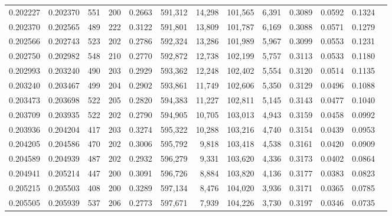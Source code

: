 \begin{tabular}{rrrrrrrrrrrrr}
0.202227 & 0.202370 &   551 & 200 &                                     0.2663 & 591,312 &  14,298 & 101,565 &   6,391 & 0.3089 & 0.0592 & 0.1324 \\
0.202370 & 0.202565 &   489 & 222 &                                     0.3122 & 591,801 &  13,809 & 101,787 &   6,169 & 0.3088 & 0.0571 & 0.1279 \\
0.202566 & 0.202743 &   523 & 202 &                                     0.2786 & 592,324 &  13,286 & 101,989 &   5,967 & 0.3099 & 0.0553 & 0.1231 \\
0.202750 & 0.202982 &   548 & 210 &                                     0.2770 & 592,872 &  12,738 & 102,199 &   5,757 & 0.3113 & 0.0533 & 0.1180 \\
0.202993 & 0.203240 &   490 & 203 &                                     0.2929 & 593,362 &  12,248 & 102,402 &   5,554 & 0.3120 & 0.0514 & 0.1135 \\
0.203240 & 0.203467 &   499 & 204 &                                     0.2902 & 593,861 &  11,749 & 102,606 &   5,350 & 0.3129 & 0.0496 & 0.1088 \\
0.203473 & 0.203698 &   522 & 205 &                                     0.2820 & 594,383 &  11,227 & 102,811 &   5,145 & 0.3143 & 0.0477 & 0.1040 \\
0.203709 & 0.203935 &   522 & 202 &                                     0.2790 & 594,905 &  10,705 & 103,013 &   4,943 & 0.3159 & 0.0458 & 0.0992 \\
0.203936 & 0.204204 &   417 & 203 &                                     0.3274 & 595,322 &  10,288 & 103,216 &   4,740 & 0.3154 & 0.0439 & 0.0953 \\
0.204205 & 0.204586 &   470 & 202 &                                     0.3006 & 595,792 &   9,818 & 103,418 &   4,538 & 0.3161 & 0.0420 & 0.0909 \\
0.204589 & 0.204939 &   487 & 202 &                                     0.2932 & 596,279 &   9,331 & 103,620 &   4,336 & 0.3173 & 0.0402 & 0.0864 \\
0.204941 & 0.205214 &   447 & 200 &                                     0.3091 & 596,726 &   8,884 & 103,820 &   4,136 & 0.3177 & 0.0383 & 0.0823 \\
0.205215 & 0.205503 &   408 & 200 &                                     0.3289 & 597,134 &   8,476 & 104,020 &   3,936 & 0.3171 & 0.0365 & 0.0785 \\
0.205505 & 0.205939 &   537 & 206 &                                     0.2773 & 597,671 &   7,939 & 104,226 &   3,730 & 0.3197 & 0.0346 & 0.0735 \\

\end{tabular}
